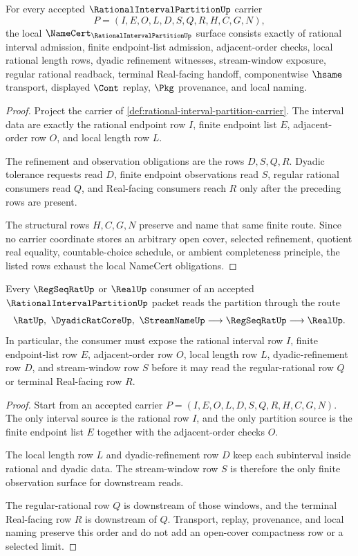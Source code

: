 \begin{theorem}
\label{thm:rational-interval-partition-namecert-obligations}
For every accepted $\RationalIntervalPartitionUp$ carrier
$$
P=(I,E,O,L,D,S,Q,R,H,C,G,N),
$$
the local $\NameCert_{\RationalIntervalPartitionUp}$ surface consists exactly of rational interval admission, finite endpoint-list admission, adjacent-order checks, local rational length rows, dyadic refinement witnesses, stream-window exposure, regular rational readback, terminal Real-facing handoff, componentwise $\hsame$ transport, displayed $\Cont$ replay, $\Pkg$ provenance, and local naming.
\end{theorem}
\begin{proof}
Project the carrier of \autoref{def:rational-interval-partition-carrier}. The interval data are exactly the rational endpoint row $I$, finite endpoint list $E$, adjacent-order row $O$, and local length row $L$.

The refinement and observation obligations are the rows $D,S,Q,R$. Dyadic tolerance requests read $D$, finite endpoint observations read $S$, regular rational consumers read $Q$, and Real-facing consumers reach $R$ only after the preceding rows are present.

The structural rows $H,C,G,N$ preserve and name that same finite route. Since no carrier coordinate stores an arbitrary open cover, selected refinement, quotient real equality, countable-choice schedule, or ambient completeness principle, the listed rows exhaust the local NameCert obligations.
\end{proof}

\begin{theorem}
\label{thm:rational-interval-partition-completion-handoff}
Every $\RegSeqRatUp$ or $\RealUp$ consumer of an accepted $\RationalIntervalPartitionUp$ packet reads the partition through the route
$$
\RatUp,\ \DyadicRatCoreUp,\ \StreamNameUp \longrightarrow \RegSeqRatUp \longrightarrow \RealUp .
$$
In particular, the consumer must expose the rational interval row $I$, finite endpoint-list row $E$, adjacent-order row $O$, local length row $L$, dyadic-refinement row $D$, and stream-window row $S$ before it may read the regular-rational row $Q$ or terminal Real-facing row $R$.
\end{theorem}
\begin{proof}
Start from an accepted carrier $P=(I,E,O,L,D,S,Q,R,H,C,G,N)$. The only interval source is the rational row $I$, and the only partition source is the finite endpoint list $E$ together with the adjacent-order checks $O$.

The local length row $L$ and dyadic-refinement row $D$ keep each subinterval inside rational and dyadic data. The stream-window row $S$ is therefore the only finite observation surface for downstream reads.

The regular-rational row $Q$ is downstream of those windows, and the terminal Real-facing row $R$ is downstream of $Q$. Transport, replay, provenance, and local naming preserve this order and do not add an open-cover compactness row or a selected limit.
\end{proof}

